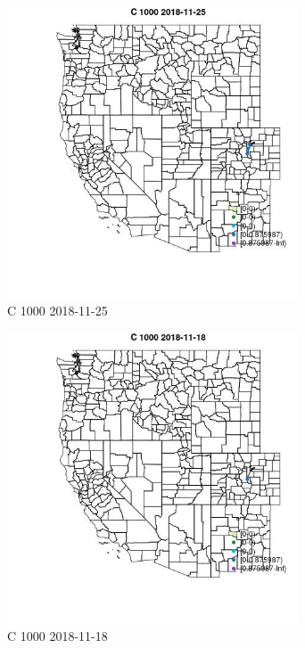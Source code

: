 \begin{figure} 
\centering  
\includegraphics[width=0.77\textwidth]{Code_Outputs/Report_ML_input_PM25_Step4_part_e_de_duplicated_aveswNAs_MapObsC_10002018-11-25.jpg} 
\caption{\label{fig:Report_ML_input_PM25_Step4_part_e_de_duplicated_aveswNAsMapObsC_10002018-11-25}C 1000 2018-11-25} 
\end{figure} 
 

\begin{figure} 
\centering  
\includegraphics[width=0.77\textwidth]{Code_Outputs/Report_ML_input_PM25_Step4_part_e_de_duplicated_aveswNAs_MapObsC_10002018-11-18.jpg} 
\caption{\label{fig:Report_ML_input_PM25_Step4_part_e_de_duplicated_aveswNAsMapObsC_10002018-11-18}C 1000 2018-11-18} 
\end{figure} 
 

